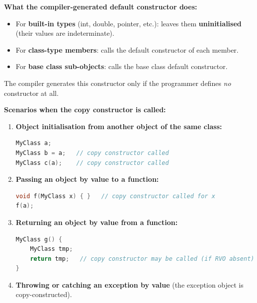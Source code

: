 \documentclass[12pt,a3paper]{article}
\begin{document}
\begin{enumerate}
\begin{tcolorbox}[enhanced,breakable,ansbox,colback=cA!4,colframe=cA,
  boxrule=0.8pt,arc=5pt,
  title={\textbf{Answer}},fonttitle=\bfseries\color{white},colbacktitle=cA]

\textbf{What the compiler-generated default constructor does:}
\begin{itemize}[itemsep=2pt]
  \item For \textbf{built-in types} (int, double, pointer, etc.):
    leaves them \textbf{uninitialised} (their values are
    indeterminate).
  \item For \textbf{class-type members}: calls the default
    constructor of each member.
  \item For \textbf{base class sub-objects}: calls the base class
    default constructor.
\end{itemize}
The compiler generates this constructor only if the programmer
defines \emph{no} constructor at all.

\medskip
\textbf{Scenarios when the copy constructor is called:}

\begin{enumerate}[label=\textbf{\arabic*.}]
  \item \textbf{Object initialisation from another object of the
    same class:}
\begin{lstlisting}[language=C++]
MyClass a;
MyClass b = a;   // copy constructor called
MyClass c(a);    // copy constructor called
\end{lstlisting}

  \item \textbf{Passing an object by value to a function:}
\begin{lstlisting}[language=C++]
void f(MyClass x) { }   // copy constructor called for x
f(a);
\end{lstlisting}

  \item \textbf{Returning an object by value from a function:}
\begin{lstlisting}[language=C++]
MyClass g() {
    MyClass tmp;
    return tmp;   // copy constructor may be called (if RVO absent)
}
\end{lstlisting}

  \item \textbf{Throwing or catching an exception by value} (the
    exception object is copy-constructed).
\end{enumerate}


\end{tcolorbox}
\end{enumerate}
\end{document}
